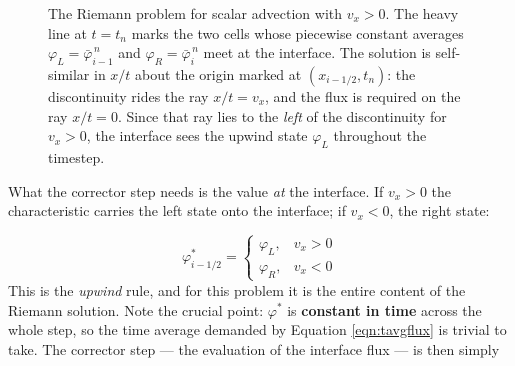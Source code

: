 \documentclass[notoc]{tufte-handout}
\begin{document}
\begin{figure}[htbp]
\centering
{}
\caption{The Riemann problem for scalar advection with $v_x > 0$. The heavy line at $t = t_n$ marks the two cells whose piecewise constant averages $\varphi_L = \bar{\varphi}_{i-1}^{\,n}$ and $\varphi_R = \bar{\varphi}_{i}^{\,n}$ meet at the interface. The solution is self-similar in $x/t$ about the origin marked at $(x_{i-1/2}, t_n)$: the discontinuity rides the ray $x/t = v_x$, and the flux is required on the ray $x/t = 0$. Since that ray lies to the {\it left} of the discontinuity for $v_x > 0$, the interface sees the upwind state $\varphi_L$ throughout the timestep.}
\label{fig:riemann}
\end{figure}

What the corrector step needs is the value {\it at} the interface. If $v_x > 0$ the characteristic carries the left state onto the interface; if $v_x < 0$, the right state:

\begin{equation}
\varphi^*_{i-1/2} = \begin{cases}
\varphi_L, & v_x > 0 \\
\varphi_R, & v_x < 0
\end{cases}
\end{equation}
%
This is the {\it upwind} rule, and for this problem it is the entire content of the Riemann solution. Note the crucial point: $\varphi^*$ is {\bf constant in time} across the whole step, so the time average demanded by Equation \ref{eqn:tavgflux} is trivial to take. The corrector step --- the evaluation of the interface flux --- is then simply
\end{document}
